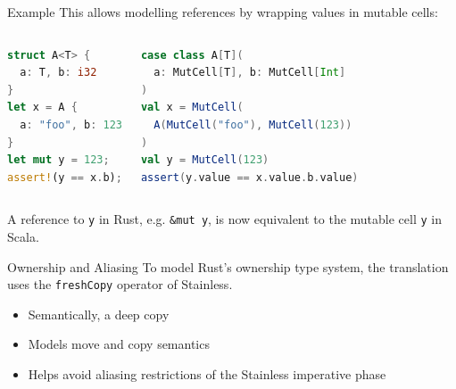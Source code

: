 \begin{frame}[fragile]{Example}
This allows modelling references by wrapping values in mutable cells:

\begin{columns}
\begin{lstlisting}[language=Rust]
struct A<T> {
  a: T, b: i32
}
let x = A {
  a: "foo", b: 123
}
let mut y = 123;
assert!(y == x.b);
\end{lstlisting}
\begin{lstlisting}[language=Scala]
case class A[T](
  a: MutCell[T], b: MutCell[Int]
)
val x = MutCell(
  A(MutCell("foo"), MutCell(123))
)
val y = MutCell(123)
assert(y.value == x.value.b.value)
\end{lstlisting}
\end{columns}

A reference to \lstinline!y! in Rust, e.g. \lstinline!&mut y!, is now equivalent
to the mutable cell \lstinline!y! in Scala.
\end{frame}



\begin{frame}{Ownership and Aliasing}
To model Rust's ownership type system, the translation uses the
\lstinline!freshCopy! operator of Stainless.

\begin{itemize}
\item Semantically, a deep copy
\item Models move and copy semantics
\item Helps avoid aliasing restrictions of the Stainless imperative phase
\end{itemize}
\end{frame}


